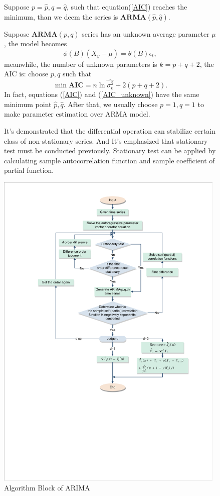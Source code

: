 \documentclass{mcmthesis}
\numberwithin{figure}{section}
\numberwithin{table}{section}
\numberwithin{equation}{section}
\begin{document}
\begin{figure}[ht]
\begin{minipage}[htbp]{0.37\linewidth}
  Suppose $ p = \hat{p}, q = \hat{q} $, such that equation(\ref{AIC}) reaches the minimum,
than we deem the series is $ \mathbf{ARMA}(\hat{p},\hat{q}) $. 
\par
Suppose $ \mathbf{ARMA}(p,q) $ series has an unknown average parameter $ \mu $,
the model becomes
$$
  \phi(B)(X_y-\mu) = \theta(B)\epsilon_t,
$$   
meanwhile, the number of unknown parameters is $ k = p+q+2 $, the AIC is:
choose $ p,q $ such that
\begin{equation}\label{AIC_unknown}
  \min \mathbf{AIC} = n\ln\hat{\sigma_\epsilon^2}+2(p+q+2).
\end{equation}  
In fact, equations (\ref{AIC}) and (\ref{AIC_unknown}) have the same minimum point $ \hat{p},\hat{q} $.
After that, we usually choose $ p = 1, q = 1 $ to make parameter estimation 
over ARMA model.
\par
It's demonstrated that the differential operation can stabilize 
certain class of non-stationary series. And It's emphasized that 
stationary test must be conducted previously. Stationary test can 
be applied by calculating sample autocorrelation function and 
sample coefficient of partial function. 
\end{minipage}
\hfill
\begin{minipage}[htbp]{0.6\linewidth}
  \begin{flushleft}
    \includegraphics[width =11cm]{code&pic/ARIMA_裁剪页面.pdf}
   \caption{Algorithm Block of ARIMA}\label{ARIMA_ALGO}
  \end{flushleft}
\end{minipage}
\end{figure}
\end{document}
